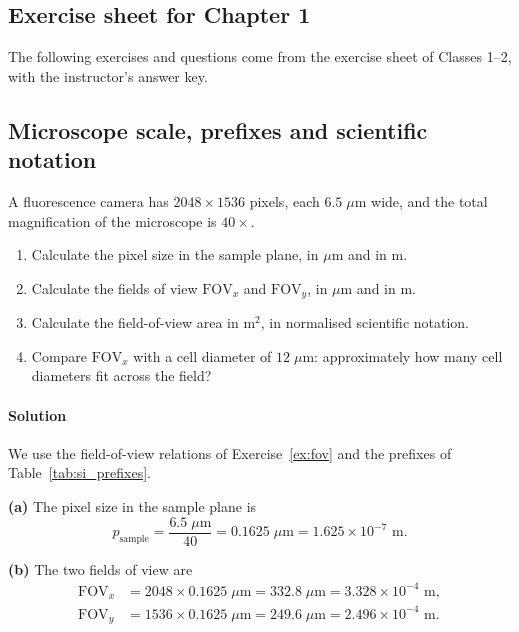 \subsection*{Exercise sheet for Chapter 1}

The following exercises and questions come from the exercise sheet of Classes 1--2, with the instructor's answer key.

\subsection{Microscope scale, prefixes and scientific notation}
\label{ex:camera_fov}

A fluorescence camera has $2048 \times 1536$ pixels, each $6.5\;\mu\text{m}$ wide, and the total magnification of the microscope is $40\times$.
\begin{enumerate}[label=(\alph*)]
    \item Calculate the pixel size in the sample plane, in $\mu$m and in m.
    \item Calculate the fields of view $\text{FOV}_x$ and $\text{FOV}_y$, in $\mu$m and in m.
    \item Calculate the field-of-view area in $\text{m}^2$, in normalised scientific notation.
    \item Compare $\text{FOV}_x$ with a cell diameter of $12\;\mu\text{m}$: approximately how many cell diameters fit across the field?
\end{enumerate}

\paragraph{Solution} We use the field-of-view relations of Exercise~\ref{ex:fov} and the prefixes of Table~\ref{tab:si_prefixes}.

\textbf{(a)} The pixel size in the sample plane is
\begin{equation*}
p_{\text{sample}} = \frac{6.5\;\mu\text{m}}{40} = 0.1625\;\mu\text{m} = 1.625 \times 10^{-7}\text{ m}.
\end{equation*}

\textbf{(b)} The two fields of view are
\begin{align*}
\text{FOV}_x &= 2048 \times 0.1625\;\mu\text{m} = 332.8\;\mu\text{m} = 3.328 \times 10^{-4}\text{ m}, \\
\text{FOV}_y &= 1536 \times 0.1625\;\mu\text{m} = 249.6\;\mu\text{m} = 2.496 \times 10^{-4}\text{ m}.
\end{align*}

